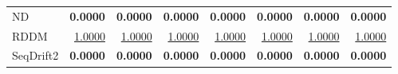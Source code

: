 \begin{table}
\begin{tabular}{lrrrrrrr}
ND & \textbf{0.0000} & \textbf{0.0000} & \textbf{0.0000} & \textbf{0.0000} & \textbf{0.0000} & \textbf{0.0000} & \textbf{0.0000} \\
RDDM & \underline{1.0000} & \underline{1.0000} & \underline{1.0000} & \underline{1.0000} & \underline{1.0000} & \underline{1.0000} & \underline{1.0000} \\
SeqDrift2 & \textbf{0.0000} & \textbf{0.0000} & \textbf{0.0000} & \textbf{0.0000} & \textbf{0.0000} & \textbf{0.0000} & \textbf{0.0000} \\
\bottomrule
\end{tabular}
\end{table}
